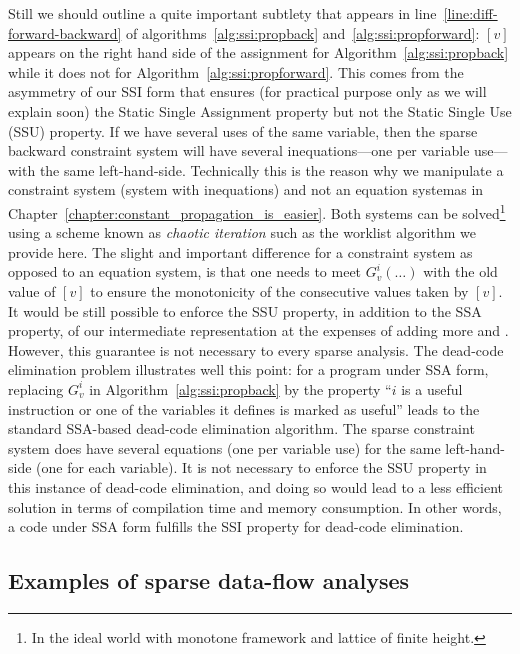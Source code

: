 {Still we should outline a quite important subtlety that appears in 
line~\ref{line:diff-forward-backward} of algorithms~\ref{alg:ssi:propback} 
and~\ref{alg:ssi:propforward}: $[v]$ appears on the right hand side of the 
assignment for Algorithm~\ref{alg:ssi:propback} while it does not for 
Algorithm~\ref{alg:ssi:propforward}. This comes from the asymmetry of our SSI 
form that ensures (for practical purpose only as we will explain soon) the 
Static Single Assignment property but not the Static Single Use (SSU) property.
If we have several uses of the same variable, then the sparse backward 
constraint system will have several inequations---one per variable use---with 
the same left-hand-side.
Technically this is the reason why we manipulate a constraint system (system 
with inequations) and not an equation system\ifconstantprop as in 
Chapter~\ref{chapter:constant_propagation_is_easier}\fi. Both systems can be 
solved\footnote{In the ideal world with monotone framework and lattice of 
finite height.} using a scheme known as \emph{chaotic iteration} such as the worklist algorithm we provide here. The slight and 
important difference for a constraint system as opposed to an equation system, 
is that one needs to meet $G_v^i(\dots)$ with the old value of $[v]$ to ensure 
the monotonicity of the consecutive values taken by $[v]$.
It would be still possible to enforce the SSU property, in addition to the SSA property, of our intermediate representation at the expenses of adding more \phifuns and \sigmafuns.
However, this guarantee is not necessary to every sparse analysis.
The dead-code elimination problem illustrates well this point:
for a program under SSA form, replacing $G_v^i$ in 
Algorithm~\ref{alg:ssi:propback} by the property ``$i$ is a useful instruction 
or one of the variables it defines is marked as useful'' leads to the standard 
SSA-based dead-code elimination algorithm.
The sparse constraint system does have several equations (one per variable use) for the same left-hand-side (one for each variable).
It is not necessary to enforce the SSU property in this instance of dead-code 
elimination, and doing so would lead to a less efficient solution in terms of 
compilation time and memory consumption.
In other words, a code under SSA form fulfills the SSI property for dead-code elimination.

\subsection{Examples of sparse data-flow analyses}
\label{sub:ssi:examples}

}
